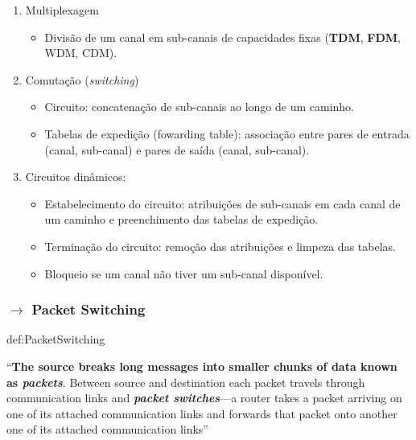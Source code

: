{

\begin{mdframed}
\begin{enumerate}[label=$\blacktriangle$]
    \item Multiplexagem
        
        \vspace{-0.75em}
        \begin{itemize}
            \item Divisão de um canal em sub-canais de capacidades fixas (\textbf{TDM}, \textbf{FDM}, WDM, CDM).
        \end{itemize}
    \item Comutação (\textit{switching})
        
        \vspace{-0.75em}
        \begin{itemize}
            \item Circuito: concatenação de sub-canais ao longo de um caminho.
            \item Tabelas de expedição (fowarding table): associação entre pares de entrada (canal, sub-canal) e pares de saída (canal, sub-canal).
        \end{itemize}
        \item Circuitos dinâmicos:
        
        \vspace{-0.75em}
        \begin{itemize}
            \item Estabelecimento do circuito: atribuições de sub-canais em cada canal de um
                caminho e preenchimento das tabelas de expedição.
            \item Terminação do circuito: remoção das atribuições e limpeza das tabelas.
            \item Bloqueio se um canal não tiver um sub-canal disponível.
        \end{itemize}
\end{enumerate}
\end{mdframed}
}

\subsubsection[1.2.2 Packet Switching]{$\pmb{\rightarrow}$ Packet Switching}

\begin{theo}{def:PacketSwitching}\label{def:PacketSwitching}

    ``\textbf{The source breaks long messages into smaller chunks of data known as \textit{packets}}. Between source and destination each packet travels through communication
    links and \textbf{\textit{packet switches}}---a router takes a packet arriving on one of its attached communication links and forwards that packet onto another one of its attached communication
links''\cite{Kurose2017}
\end{theo}


